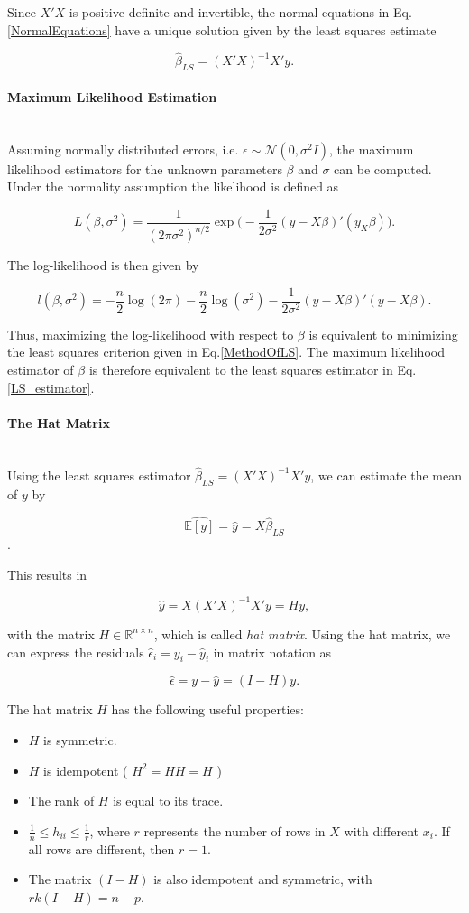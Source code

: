 \documentclass[10pt,a4paper]{article}
\newcommand{\subsubsubsection}[1]{\paragraph{#1}\mbox{}\\}
\begin{document}
Since $X'X$ is positive definite and invertible, the normal equations in Eq.\ref{NormalEquations} have a unique solution given by the least squares estimate

\begin{equation} \label{LS_estimator}
\hat \beta_{LS} = (X'X)^{-1}X'y.
\end{equation}

\subsubsubsection{Maximum Likelihood Estimation}

Assuming normally distributed errors, i.e. $\epsilon \sim \mathcal N(0, \sigma^2I)$, the maximum likelihood estimators for the unknown parameters $\beta$ and $\sigma$ can be computed. Under the normality assumption the likelihood is defined as

$$L(\beta, \sigma^2) = \frac{1}{(2\pi\sigma^2)^{n/2}} \exp \Big( -\frac{1}{2\sigma^2}(y-X\beta)'(y_X\beta) \Big).$$

The log-likelihood is then given by

$$l(\beta, \sigma^2) = -\frac{n}{2}\log(2\pi) - \frac{n}{2}\log(\sigma^2) - \frac{1}{2\sigma^2}(y - X\beta)'(y - X\beta).$$

Thus, maximizing the log-likelihood with respect to $\beta$ is equivalent to minimizing the least squares criterion given in Eq.\ref{MethodOfLS}. The maximum likelihood estimator of $\beta$ is therefore equivalent to the least squares estimator in Eq.\ref{LS_estimator}.

\subsubsubsection{The Hat Matrix}

Using the least squares estimator $\hat \beta_{LS} = (X'X)^{-1}X'y$, we can estimate the mean of $y$ by 

$$\widehat{\mathbb{E}[y]} = \hat y = X\hat\beta_{LS}$$. 

This results in 

\begin{equation} \label{HatMatrix}
	\hat y = X(X'X)^{-1}X'y = Hy,
\end{equation}

with the matrix $H \in \mathbb{R}^{n \times n}$, which is called \emph{hat matrix}. Using the hat matrix, we can express the residuals $\hat \epsilon_i = y_i - \hat y_i$ in matrix notation as

$$\hat \epsilon = y - \hat y = (I - H) y.$$

The hat matrix $H$ has the following useful properties:

\begin{itemize}
\item  $H$ is symmetric.
\item $H$ is idempotent ( $H^2 = HH = H$ )
\item The rank of $H$ is equal to its trace.
\item $\frac{1}{n} \le h_{ii} \le \frac{1}{r}$, where $r$ represents the number of rows in $X$ with different $x_i$. If all rows are different, then $r = 1$.
\item The matrix $(I - H)$ is also idempotent and symmetric, with $rk(I - H) = n-p$.
\end{itemize}
\end{document}
